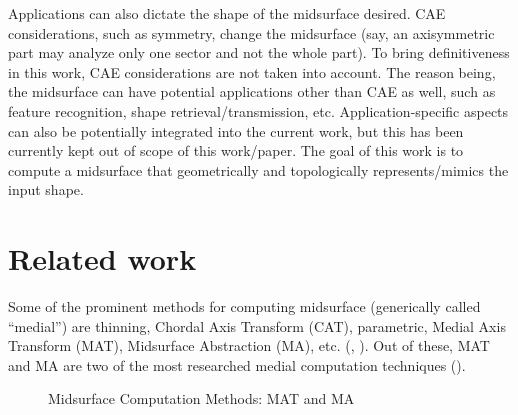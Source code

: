 Applications can also dictate the shape of the midsurface desired. CAE considerations, such as symmetry, change the midsurface (say, an axisymmetric part may analyze only one sector and not the whole part). To bring definitiveness in this work, CAE considerations are not taken into account. The reason being, the midsurface can have potential applications other than CAE as well, such as feature recognition, shape retrieval/transmission, etc. Application-specific aspects can also be potentially integrated into the current work, but this has been currently kept out of scope of this work/paper. The goal of this work is to compute a midsurface that geometrically and topologically represents/mimics the input shape.


\section{Related work}

Some of the prominent methods for computing midsurface (generically called ``medial'') are thinning, Chordal Axis Transform (CAT), parametric, Medial Axis Transform (MAT), Midsurface Abstraction (MA), etc. (\cite{Lam1992}, \cite{Yogesh2010}). Out of these, MAT and  MA are two of the most researched medial computation techniques (\cite{Sheen2010}). 

\begin{figure}[h!]
\centering     %
{}
 \quad
{} \quad
\caption{Midsurface Computation Methods: MAT and MA}
\end{figure}

